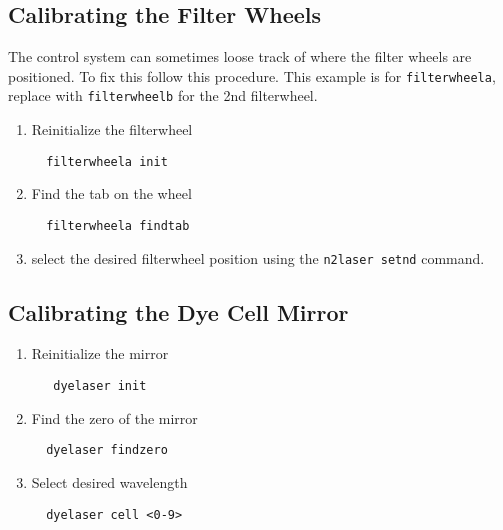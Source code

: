 \subsection{Calibrating the Filter Wheels}
The control system can sometimes loose track
of where the filter wheels are positioned.
To fix this follow this procedure.  This example
is for {\tt filterwheela}, replace with 
{\tt filterwheelb} for the 2nd filterwheel.
\begin{enumerate}
\item Reinitialize the filterwheel
  \begin{verbatim}
  filterwheela init
  \end{verbatim}
\item Find the tab on the wheel
  \begin{verbatim}
  filterwheela findtab
  \end{verbatim}
\item select the desired filterwheel position using
  the {\tt n2laser setnd} command.
\end{enumerate}

\subsection{Calibrating the Dye Cell Mirror}
\begin{enumerate}
\item Reinitialize the mirror
  \begin{verbatim}
   dyelaser init
  \end{verbatim}
\item Find the zero of the mirror
  \begin{verbatim}
  dyelaser findzero
  \end{verbatim}
\item Select desired wavelength
  \begin{verbatim}
  dyelaser cell <0-9>
  \end{verbatim}
\end{enumerate}









